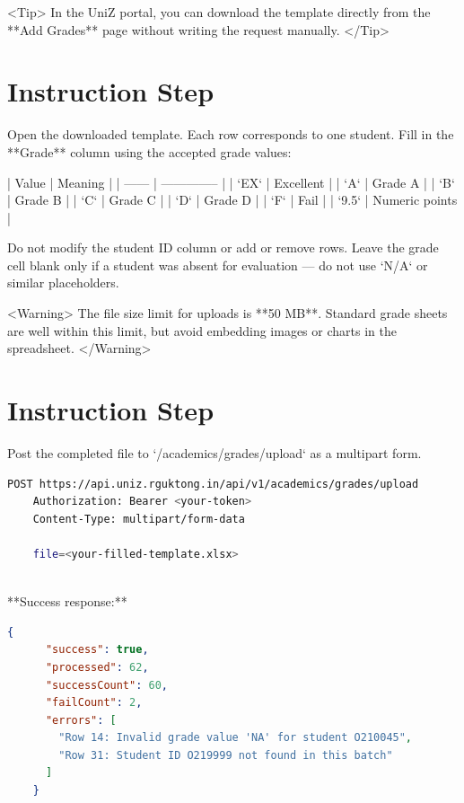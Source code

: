     <Tip>
      In the UniZ portal, you can download the template directly from the
      **Add Grades** page without writing the request manually.
    </Tip>

  

  
\section{Instruction Step}

    Open the downloaded template. Each row corresponds to one student. Fill in
    the **Grade** column using the accepted grade values:

    | Value  | Meaning        |
    | ------ | -------------- |
    | `EX`   | Excellent       |
    | `A`    | Grade A         |
    | `B`    | Grade B         |
    | `C`    | Grade C         |
    | `D`    | Grade D         |
    | `F`    | Fail            |
    | `9.5`  | Numeric points  |

    Do not modify the student ID column or add or remove rows. Leave the grade
    cell blank only if a student was absent for evaluation — do not use `N/A`
    or similar placeholders.

    <Warning>
      The file size limit for uploads is **50 MB**. Standard grade sheets are
      well within this limit, but avoid embedding images or charts in the
      spreadsheet.
    </Warning>

  

  
\section{Instruction Step}

    Post the completed file to `/academics/grades/upload` as a multipart form.

    \begin{lstlisting}[language=bash]
    POST https://api.uniz.rguktong.in/api/v1/academics/grades/upload
    Authorization: Bearer <your-token>
    Content-Type: multipart/form-data

    file=<your-filled-template.xlsx>
    
\end{lstlisting}

    **Success response:**

    \begin{lstlisting}[language=json]
    {
      "success": true,
      "processed": 62,
      "successCount": 60,
      "failCount": 2,
      "errors": [
        "Row 14: Invalid grade value 'NA' for student O210045",
        "Row 31: Student ID O219999 not found in this batch"
      ]
    }
    
\end{lstlisting}


